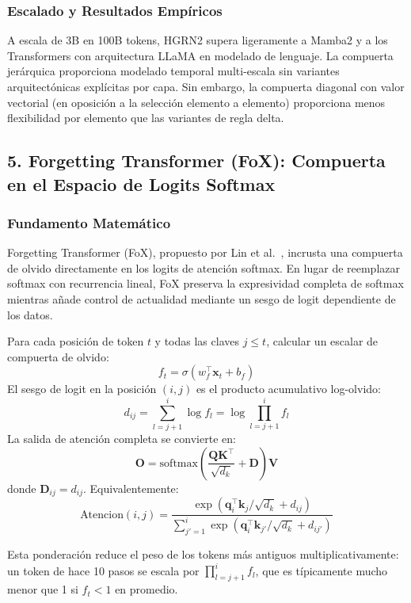 \documentclass[11pt,a4paper]{article}
\begin{document}
\subsubsection{Escalado y Resultados Empíricos}

A escala de 3B en 100B tokens, HGRN2 supera ligeramente a Mamba2 y a los Transformers con arquitectura LLaMA en modelado de lenguaje. La compuerta jerárquica proporciona modelado temporal multi-escala sin variantes arquitectónicas explícitas por capa. Sin embargo, la compuerta diagonal con valor vectorial (en oposición a la selección elemento a elemento) proporciona menos flexibilidad por elemento que las variantes de regla delta.

\subsection{5. Forgetting Transformer (FoX): Compuerta en el Espacio de Logits Softmax}

\subsubsection{Fundamento Matemático}

Forgetting Transformer (FoX), propuesto por Lin et al.~\citep{lin_forgetting_transformer_2025}, incrusta una compuerta de olvido directamente en los logits de atención softmax. En lugar de reemplazar softmax con recurrencia lineal, FoX preserva la expresividad completa de softmax mientras añade control de actualidad mediante un sesgo de logit dependiente de los datos.

Para cada posición de token $t$ y todas las claves $j \le t$, calcular un escalar de compuerta de olvido:
\[
f_t = \sigma(w_f^\top \mathbf{x}_t + b_f)
\]
El sesgo de logit en la posición $(i,j)$ es el producto acumulativo log-olvido:
\[
d_{ij} = \sum_{l=j+1}^{i} \log f_l = \log \prod_{l=j+1}^{i} f_l
\]
La salida de atención completa se convierte en:
\[
\mathbf{O} = \text{softmax}\left(\frac{\mathbf{Q}\mathbf{K}^\top}{\sqrt{d_k}} + \mathbf{D}\right) \mathbf{V}
\]
donde $\mathbf{D}_{ij} = d_{ij}$. Equivalentemente:
\[
\text{Atencion}(i,j) = \frac{\exp(\mathbf{q}_i^\top \mathbf{k}_j / \sqrt{d_k} + d_{ij})}{\sum_{j'=1}^{i} \exp(\mathbf{q}_i^\top \mathbf{k}_{j'} / \sqrt{d_k} + d_{ij'})}
\]

Esta ponderación reduce el peso de los tokens más antiguos multiplicativamente: un token de hace 10 pasos se escala por $\prod_{l=j+1}^{i} f_l$, que es típicamente mucho menor que 1 si $f_t < 1$ en promedio.
\end{document}
